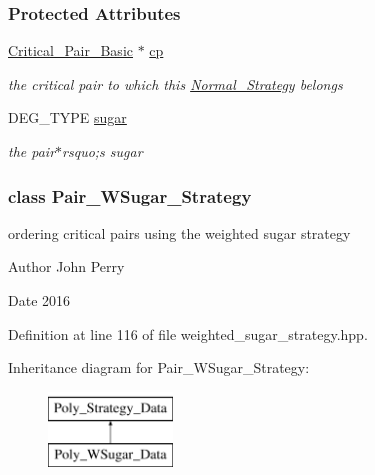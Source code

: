 \subsubsection*{Protected Attributes}
\begin{DoxyCompactItemize}
\item 
\mbox{\label{group__strategygroup_a296c0a6eb2e16d5b7628ccf3df8f29c6}} 
\hyperlink{group___g_b_computation_class_critical___pair___basic}{Critical\+\_\+\+Pair\+\_\+\+Basic} $\ast$ \hyperlink{group__strategygroup_a296c0a6eb2e16d5b7628ccf3df8f29c6}{cp}
\begin{DoxyCompactList}\small\item\em the critical pair to which this {\ttfamily \hyperlink{group__strategygroup_class_normal___strategy}{Normal\+\_\+\+Strategy}} belongs \end{DoxyCompactList}\item 
\mbox{\label{group__strategygroup_a8d743628b73ac3f4de3df1ec306263bb}} 
D\+E\+G\+\_\+\+T\+Y\+PE \hyperlink{group__strategygroup_a8d743628b73ac3f4de3df1ec306263bb}{sugar}
\begin{DoxyCompactList}\small\item\em the pair$\ast$rsquo;s sugar \end{DoxyCompactList}\end{DoxyCompactItemize}
\label{class_pair___w_sugar___strategy}
\subsubsection{class Pair\+\_\+\+W\+Sugar\+\_\+\+Strategy}
ordering critical pairs using the weighted sugar strategy 

\begin{DoxyAuthor}{Author}
John Perry 
\end{DoxyAuthor}
\begin{DoxyDate}{Date}
2016 
\end{DoxyDate}


Definition at line 116 of file weighted\+\_\+sugar\+\_\+strategy.\+hpp.

Inheritance diagram for Pair\+\_\+\+W\+Sugar\+\_\+\+Strategy\+:\begin{figure}[H]
\begin{center}
\leavevmode
\includegraphics[height=2.000000cm]{group__strategygroup}
\end{center}
\end{figure}
